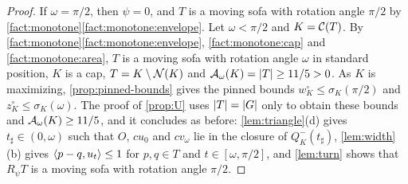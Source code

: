\begin{proof}
If $\omega=\pi/2$, then $\psi=0$, and $T$ is a moving sofa with rotation angle
$\pi/2$ by \cref{fact:monotone}\ref{fact:monotone:envelope}. Let $\omega<\pi/2$
and $K=\mathcal{C}(T)$. By \cref{fact:monotone}\ref{fact:monotone:envelope},
\ref{fact:monotone:cap} and \ref{fact:monotone:area}, $T$ is a moving sofa with
rotation angle $\omega$ in standard position, $K$ is a cap, $T=K\setminus\mathcal{N}(K)$
and $\mathcal{A}_\omega(K)=\lvert T\rvert\ge11/5>0$. As $K$ is maximizing,
\cref{prop:pinned-bounds} gives the pinned bounds $w^\circ_K\le\sigma_K(\pi/2)$
and $z^\circ_K\le\sigma_K(\omega)$. The proof of \cref{prop:U} uses $\lvert T\rvert=\lvert G\rvert$ only to obtain these bounds and $\mathcal{A}_\omega(K)\ge11/5$, and it
concludes as before: \cref{lem:triangle}(d) gives $t_\sharp\in(0,\omega)$ such
that $O$, $cu_0$ and $cv_\omega$ lie in the closure of $Q^-_K(t_\sharp)$,
\cref{lem:width}(b) gives $\langle p-q,u_t\rangle\le1$ for $p,q\in T$ and
$t\in[\omega,\pi/2]$, and \cref{lem:turn} shows that $R_\psi T$ is a moving sofa
with rotation angle $\pi/2$.
\end{proof}
